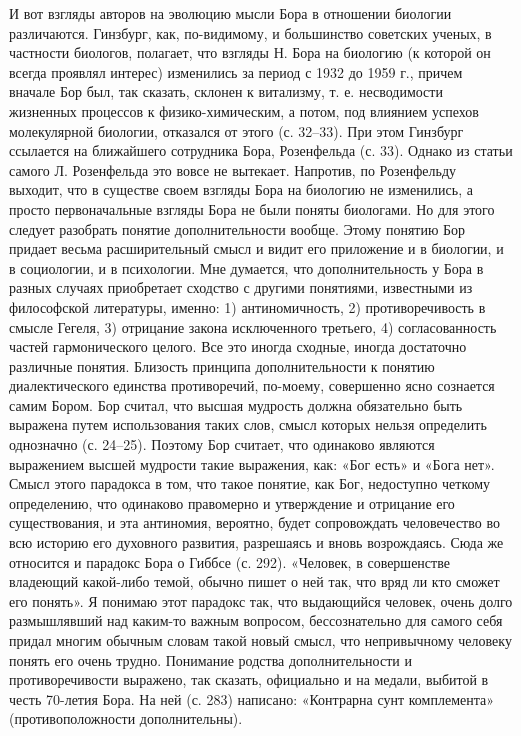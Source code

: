 И  вот взгляды  авторов на  эволюцию мысли  Бора в  отношении биологии
различаются.  Гинзбург,  как,  по-видимому,  и  большинство  советских
ученых,  в  частности  биологов,  полагает, что  взгляды  Н.  Бора  на
биологию (к которой он всегда проявлял интерес) изменились за период с
1932  до 1959  г.,  причем вначале  Бор был,  так  сказать, склонен  к
витализму, т. е. несводимости жизненных процессов к физико-химическим,
а  потом,  под  влиянием   успехов  молекулярной  биологии,  отказался
от  этого  (с. 32--33).  При  этом  Гинзбург ссылается  на  ближайшего
сотрудника  Бора, Розенфельда  (с.  33). Однако  из  статьи самого  Л.
Розенфельда это  вовсе не вытекает. Напротив,  по Розенфельду выходит,
что в существе своем взгляды Бора  на биологию не изменились, а просто
первоначальные взгляды  Бора не  были поняты  биологами. Но  для этого
следует  разобрать  понятие  дополнительности  вообще.  Этому  понятию
Бор  придает весьма  расширительный  смысл и  видит  его приложение  и
в  биологии,  и  в  социологии,  и в  психологии.  Мне  думается,  что
дополнительность  у  Бора  в  разных случаях  приобретает  сходство  с
другими понятиями,  известными из  философской литературы,  именно: 1)
антиномичность,  2) противоречивость  в  смысле  Гегеля, 3)  отрицание
закона исключенного третьего, 4) согласованность частей гармонического
целого. Все  это иногда сходные, иногда  достаточно различные понятия.
Близость принципа дополнительности  к понятию диалектического единства
противоречий,  по-моему, совершенно  ясно сознается  самим Бором.  Бор
считал,  что высшая  мудрость должна  обязательно быть  выражена путем
использования таких  слов, смысл которых нельзя  определить однозначно
(с. 24--25).  Поэтому Бор  считает, что одинаково  являются выражением
высшей мудрости такие  выражения, как: «Бог есть» и  «Бога нет». Смысл
этого парадокса в том, что  такое понятие, как Бог, недоступно четкому
определению,  что  одинаково  правомерно  и  утверждение  и  отрицание
его  существования,  и  эта антиномия,  вероятно,  будет  сопровождать
человечество во всю историю его духовного развития, разрешаясь и вновь
возрождаясь.  Сюда же  относится и  парадокс Бора  о Гиббсе  (с. 292).
«Человек, в  совершенстве владеющий  какой-либо темой, обычно  пишет о
ней так, что  вряд ли кто сможет его понять».  Я понимаю этот парадокс
так,  что выдающийся  человек, очень  долго размышлявший  над каким-то
важным вопросом, бессознательно для  самого себя придал многим обычным
словам  такой  новый  смысл,  что  непривычному  человеку  понять  его
очень  трудно. Понимание  родства дополнительности  и противоречивости
выражено,  так  сказать,  официально  и на  медали,  выбитой  в  честь
70-летия Бора. На ней (с.  283) написано: «Контрарна сунт комплемента»
(противоположности дополнительны).

